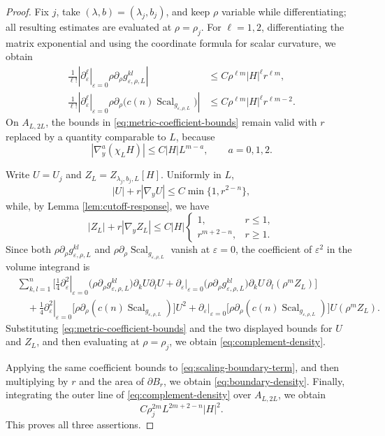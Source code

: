 \documentclass[11pt]{article}
\numberwithin{equation}{section}
\theoremstyle{remark}
\newcommand{\eps}{\varepsilon}
\begin{document}
\begin{proof}
Fix \(j\), take \((\lambda,b)=(\lambda_j,b_j)\), and keep \(\rho\) variable
while differentiating; all resulting estimates are evaluated at
\(\rho=\rho_j\). {For \(\ell=1,2\), differentiating the
matrix exponential and using the coordinate formula for scalar curvature,
we obtain}
\begin{equation}\label{eq:metric-coefficient-bounds}
 \begin{aligned}
 \frac1{\ell!}\left|
 \left.\partial_\eps^\ell\right|_{\eps=0}
 \rho\partial_\rho g_{\eps,\rho,L}^{kl}\right|
 &\le C\rho^{\ell m}|H|^{\ell}r^{\ell m},\\
 \frac1{\ell!}\left|
 \left.\partial_\eps^\ell\right|_{\eps=0}
 \rho\partial_\rho\bigl(c(n)\operatorname{Scal}_{g_{\eps,\rho,L}}\bigr)\right|
 &\le C\rho^{\ell m}|H|^{\ell}r^{\ell m-2}.
 \end{aligned}
\end{equation}
On \(A_{L,2L}\), the bounds in \eqref{eq:metric-coefficient-bounds} remain
valid with \(r\) replaced by a quantity comparable to \(L\), because
\[
|\nabla_y^a(\chi_LH)|
\le C|H|L^{m-a},\qquad a=0,1,2.
\]

Write \(U=U_j\) and
\(Z_L=Z_{\lambda_j,b_j,L}[H]\). Uniformly in \(L\),
\[
 |U|+r|\nabla_yU|
 \le C\min\{1,r^{2-n}\},
\]
{while, by Lemma  \ref{lem:cutoff-response}, we have}
\[
 |Z_L|+r|\nabla_yZ_L|
 \le C|H|
 \begin{cases}
  1,&r\le1,\\
  r^{m+2-n},&r\ge1.
 \end{cases}
\]
{Since both \(\rho\partial_\rho g_{\eps,\rho,L}^{kl}\) and
\(\rho\partial_\rho \operatorname{Scal}_{g_{\eps,\rho,L}}\) vanish at \(\eps=0\), the
coefficient of \(\eps^2\) in the volume integrand is}
\[
 \begin{aligned}
 &\sum_{k,l=1}^n\bigg[
 \frac14\left.\partial_\eps^2\right|_{\eps=0}
 \bigl(\rho\partial_\rho g_{\eps,\rho,L}^{kl}\bigr)
 \partial_kU\partial_lU
 +\left.\partial_\eps\right|_{\eps=0}
 \bigl(\rho\partial_\rho g_{\eps,\rho,L}^{kl}\bigr)
 \partial_kU\,\partial_l(\rho^mZ_L)
 \bigg]\\
 &\quad+
 \frac14\left.\partial_\eps^2\right|_{\eps=0}
 \bigl[\rho\partial_\rho(c(n)\operatorname{Scal}_{g_{\eps,\rho,L}})\bigr]U^2
 +\left.\partial_\eps\right|_{\eps=0}
 \bigl[\rho\partial_\rho(c(n)\operatorname{Scal}_{g_{\eps,\rho,L}})\bigr]
 U(\rho^mZ_L).
 \end{aligned}
\]
{Substituting \eqref{eq:metric-coefficient-bounds} and the two
displayed bounds for \(U\) and \(Z_L\), and then evaluating at
\(\rho=\rho_j\), we obtain \eqref{eq:complement-density}.}

{Applying the same coefficient bounds to
\eqref{eq:scaling-boundary-term}, and then multiplying by \(r\) and the
area of \(\partial B_r\), we obtain
\eqref{eq:boundary-density}.  Finally, integrating the outer line of
\eqref{eq:complement-density} over \(A_{L,2L}\), we obtain}
\[
 C\rho_j^{2m}L^{2m+2-n}|H|^2.
\]
This proves all three assertions.
\end{proof}
\end{document}
